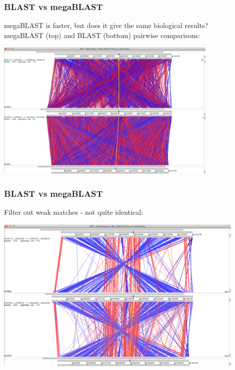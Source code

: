 \begin{frame}
  \frametitle{BLAST vs megaBLAST}
  megaBLAST is faster, but does it give the same biological results?\\[0.1cm]
  megaBLAST (top) and BLAST (bottom) pairwise comparisons:
  \begin{center}
    \includegraphics[width=0.8\textwidth]{images/act_wgs6}
  \end{center}    
\end{frame}

\begin{frame}
  \frametitle{BLAST vs megaBLAST}
  Filter out weak matches - not quite identical:
  \begin{center}
    \includegraphics[width=0.9\textwidth]{images/act_wgs7}
  \end{center}    
\end{frame}

